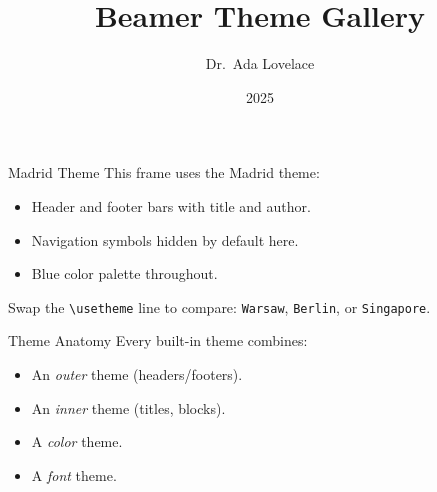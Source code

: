 \documentclass{beamer}
\title{Beamer Theme Gallery}
\author{Dr.~Ada Lovelace}
\institute{University of Mathematics}
\date{2025}
\begin{document}
\begin{frame}
  \titlepage
\end{frame}

\begin{frame}{Madrid Theme}
  This frame uses the \alert{Madrid} theme:
  \begin{itemize}
    \item Header and footer bars with title and author.
    \item Navigation symbols hidden by default here.
    \item Blue color palette throughout.
  \end{itemize}
  \vspace{0.5em}
  Swap the \texttt{\textbackslash usetheme} line to compare:
  \texttt{Warsaw}, \texttt{Berlin}, or \texttt{Singapore}.
\end{frame}

\begin{frame}{Theme Anatomy}
  Every built-in theme combines:
  \begin{itemize}
    \item An \emph{outer} theme (headers/footers).
    \item An \emph{inner} theme (titles, blocks).
    \item A \emph{color} theme.
    \item A \emph{font} theme.
  \end{itemize}
\end{frame}
\end{document}
